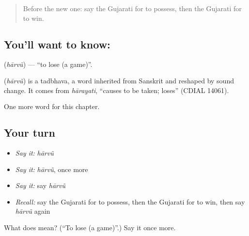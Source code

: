\label{lesson:GU-C105-harvu}



\begin{quote}
Before the new one: say the Gujarati for to possess, then the Gujarati for to win.
\end{quote}

\subsection*{You'll want to know: }
\textbf{} (\emph{hārvũ}) — \textquotedblleft{}to lose (a game)\textquotedblright{}.

\begin{cousinweb}
\textbf{} (\emph{hārvũ}) is a tadbhava, a word inherited from Sanskrit and reshaped by sound change. It comes from \emph{hārayati}, \textquotedblleft{}causes to be taken; loses\textquotedblright{} (CDIAL 14061).
\end{cousinweb}

\begin{grammarlens}[title={What you've built}]
One more word for this chapter.
\end{grammarlens}

\subsection*{Your turn}
\begin{itemize}
\raggedright
  \item \emph{Say it:} \emph{hārvũ}
  \item \emph{Say it:} \emph{hārvũ}, once more
  \item \emph{Say it:} say \emph{hārvũ}
  \item \emph{Recall:} say the Gujarati for to possess, then the Gujarati for to win, then say \emph{hārvũ} again
\end{itemize}

\begin{tcolorbox}[breakable,colback=teal!4,colframe=teal!35!black,title={Before you move on}]
What does  mean? (\textquotedblleft{}To lose (a game)\textquotedblright{}.) Say it once more.
\end{tcolorbox}
